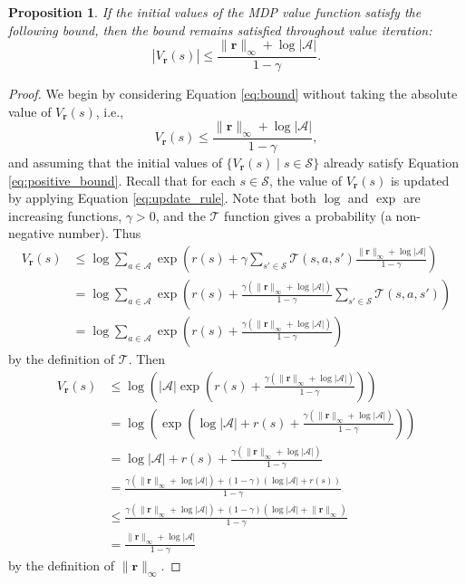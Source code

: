 \documentclass{mpaper}
\newtheorem{proposition}[theorem]{Proposition}
\newcommand{\V}{V_{\mathbf{r}}}
\newcommand{\vbound}{\frac{\rinf + \log|\mathcal{A}|}{1 - \gamma}}
\newcommand{\rinf}{\lVert \mathbf{r} \rVert_\infty}
\begin{document}
\begin{proposition} \label{thm:bound}
  If the initial values of the MDP value function satisfy the following
  bound, then the bound remains satisfied throughout value iteration:
  \begin{equation} \label{eq:bound}
    |\V(s)| \le \vbound.
  \end{equation}
\end{proposition}
\begin{proof}
  We begin by considering Equation \ref{eq:bound} without taking the absolute value of
  $\V(s)$, i.e.,
  \begin{equation} \label{eq:positive_bound}
    \V(s) \le \vbound,
  \end{equation}
  and assuming that the initial values of $\{ \V(s) \mid s \in
  \mathcal{S} \}$ already satisfy Equation \ref{eq:positive_bound}. Recall that for
  each $s \in \mathcal{S}$, the value of $\V(s)$ is updated by applying Equation
  \ref{eq:update_rule}. Note that both $\log$ and $\exp$ are increasing
  functions, $\gamma > 0$, and the $\mathcal{T}$ function gives a probability (a
  non-negative number). Thus
  \begin{align*}
    \V(s) &\le \log \sum_{a \in \mathcal{A}} \exp\left( r(s) + \gamma\sum_{s' \in \mathcal{S}} \mathcal{T}(s, a, s')\frac{\rinf + \log|\mathcal{A}|}{1 - \gamma} \right) \\
          &= \log \sum_{a \in \mathcal{A}} \exp\left( r(s) + \frac{\gamma (\rinf + \log|\mathcal{A}|)}{1 - \gamma}\sum_{s' \in \mathcal{S}} \mathcal{T}(s, a, s') \right) \\
          &= \log \sum_{a \in \mathcal{A}} \exp\left( r(s) + \frac{\gamma (\rinf + \log|\mathcal{A}|)}{1 - \gamma} \right)
  \end{align*}
  by the definition of $\mathcal{T}$. Then
  \begin{align*}
    \V(s) &\le \log \left( |\mathcal{A}| \exp\left( r(s) + \frac{\gamma (\rinf + \log|\mathcal{A}|)}{1 - \gamma} \right) \right) \\
          &= \log \left( \exp\left( \log|\mathcal{A}| + r(s) + \frac{\gamma (\rinf + \log|\mathcal{A}|)}{1 - \gamma} \right) \right) \\
          &= \log|\mathcal{A}| + r(s) + \frac{\gamma (\rinf + \log|\mathcal{A}|)}{1 - \gamma} \\
          &= \frac{\gamma (\rinf + \log|\mathcal{A}|) + (1 - \gamma)(\log|\mathcal{A}| + r(s))}{1 - \gamma} \\
          &\le \frac{\gamma (\rinf + \log|\mathcal{A}|) + (1 - \gamma)(\log|\mathcal{A}| + \rinf)}{1 - \gamma} \\
          &= \vbound
  \end{align*}
  by the definition of $\rinf$.


\end{proof}
\end{document}
